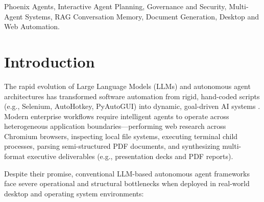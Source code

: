 \documentclass[conference]{IEEEtran}
\begin{document}
\begin{IEEEkeywords}
Phoenix Agents, Interactive Agent Planning, Governance and Security, Multi-Agent Systems, RAG Conversation Memory, Document Generation, Desktop and Web Automation.
\end{IEEEkeywords}

\section{Introduction}
\label{sec:intro}
The rapid evolution of Large Language Models (LLMs) and autonomous agent architectures has transformed software automation from rigid, hand-coded scripts (e.g., Selenium, AutoHotkey, PyAutoGUI) into dynamic, goal-driven AI systems \cite{bajoria2026}. Modern enterprise workflows require intelligent agents to operate across heterogeneous application boundaries—performing web research across Chromium browsers, inspecting local file systems, executing terminal child processes, parsing semi-structured PDF documents, and synthesizing multi-format executive deliverables (e.g., presentation decks and PDF reports).

Despite their promise, conventional LLM-based autonomous agent frameworks face severe operational and structural bottlenecks when deployed in real-world desktop and operating system environments:
\end{document}
